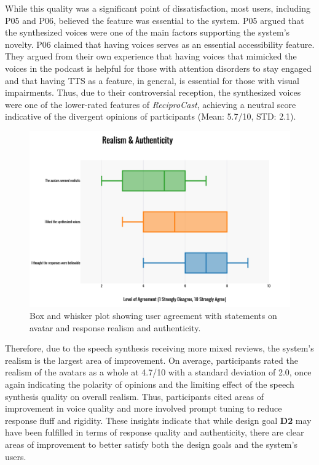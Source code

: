 \documentclass[12pt]{report}
\begin{document}
\begin{myfont}
        \indent While this quality was a significant point of dissatisfaction, most users, including P05 and P06, believed the feature was essential to the system. P05 argued that the synthesized voices were one of the main factors supporting the system's novelty. P06 claimed that having voices serves as an essential accessibility feature. They argued from their own experience that having voices that mimicked the voices in the podcast is helpful for those with attention disorders to stay engaged and that having TTS as a feature, in general, is essential for those with visual impairments. Thus, due to their controversial reception, the synthesized voices were one of the lower-rated features of \textit{ReciproCast}, achieving a neutral score indicative of the divergent opinions of participants (Mean: 5.7/10, STD: 2.1). 

        \begin{figure}[H]
        \centering
          \includegraphics[width=1\textwidth]{figures/realism.png}
          \caption{Box and whisker plot showing user agreement with statements on avatar and response realism and authenticity.}
          \label{fig:realism}
        \end{figure}

        \indent Therefore, due to the speech synthesis receiving more mixed reviews, the system's realism is the largest area of improvement. On average, participants rated the realism of the avatars as a whole at 4.7/10 with a standard deviation of 2.0, once again indicating the polarity of opinions and the limiting effect of the speech synthesis quality on overall realism. Thus, participants cited areas of improvement in voice quality and more involved prompt tuning to reduce response fluff and rigidity. These insights indicate that while design goal \textbf{D2} may have been fulfilled in terms of response quality and authenticity, there are clear areas of improvement to better satisfy both the design goals and the system's users.


\end{myfont}
\end{document}

